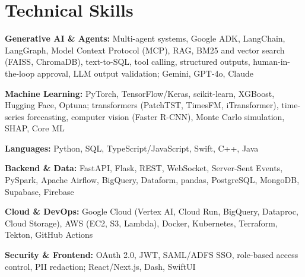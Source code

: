 \documentclass[letterpaper,10pt]{article}
\begin{document}
\section{Technical Skills}
\textbf{Generative AI \& Agents:} Multi-agent systems, Google ADK, LangChain, LangGraph, Model Context Protocol (MCP), RAG, BM25 and vector search (FAISS, ChromaDB), text-to-SQL, tool calling, structured outputs, human-in-the-loop approval, LLM output validation; Gemini, GPT-4o, Claude\par
\textbf{Machine Learning:} PyTorch, TensorFlow/Keras, scikit-learn, XGBoost, Hugging Face, Optuna; transformers (PatchTST, TimesFM, iTransformer), time-series forecasting, computer vision (Faster R-CNN), Monte Carlo simulation, SHAP, Core ML\par
\textbf{Languages:} Python, SQL, TypeScript/JavaScript, Swift, C++, Java\par
\textbf{Backend \& Data:} FastAPI, Flask, REST, WebSocket, Server-Sent Events, PySpark, Apache Airflow, BigQuery, Dataform, pandas, PostgreSQL, MongoDB, Supabase, Firebase\par
\textbf{Cloud \& DevOps:} Google Cloud (Vertex AI, Cloud Run, BigQuery, Dataproc, Cloud Storage), AWS (EC2, S3, Lambda), Docker, Kubernetes, Terraform, Tekton, GitHub Actions\par
\textbf{Security \& Frontend:} OAuth 2.0, JWT, SAML/ADFS SSO, role-based access control, PII redaction; React/Next.js, Dash, SwiftUI\par
\end{document}

